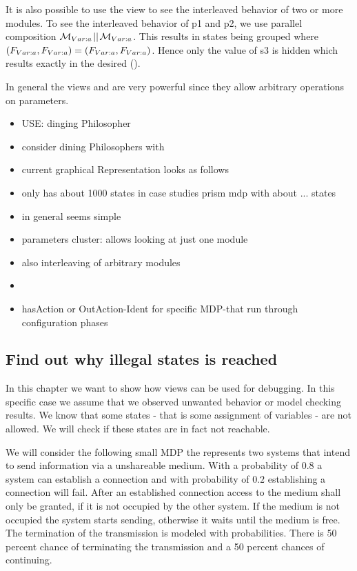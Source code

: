 \documentclass[preview]{standalone}
\begin{document}
It is also possible to use the view \viewparamvalident to see the interleaved behavior of two or more modules. To see the interleaved behavior of p1 and p2, we use parallel composition ${{{{{\mathcal{M}}}}_{{Var:{a}}}}} {\;\!{||}\;\!} {{{{{\mathcal{M}}}}_{{Var:{a}}}}}$. This results in states being grouped where $({{F_{{Var:{a}}}}}, {{F_{{Var:{a}}}}}) = ({{F_{{Var:{a}}}}}, {{F_{{Var:{a}}}}})$. Hence only the value of s3 is hidden which results exactly in the desired  ().

In general the views \viewparamdnf and \viewparamcnf are very powerful since they allow arbitrary operations on parameters.

\begin{itemize}
	\item USE: dinging Philosopher
	\item consider dining Philosophers with
	\item current graphical Representation looks as follows
	\item only has about 1000 states in case studies prism mdp with about ... states
	\item in general seems simple
	\item parameters cluster: allows looking at just one module
	\item also interleaving of arbitrary modules
	\item
	\item hasAction or OutAction-Ident for specific MDP-that run through configuration phases
	
\end{itemize}

\subsection{Find out why illegal states is reached}
In this chapter we want to show how views can be used for debugging. In this specific case we assume that we observed unwanted behavior or model checking results. We know that some states - that is some assignment of variables - are not allowed. We will check if these states are in fact not reachable.

We will consider the following small MDP the represents two systems that intend to send information via a unshareable medium. With a probability of $0.8$ a system can establish a connection and with probability of $0.2$ establishing a connection will fail. After an established connection access to the medium shall only be granted, if it is not occupied by the other system. If the medium is not occupied the system starts sending, otherwise it waits until the medium is free. The termination of the transmission is modeled with probabilities. There is 50 percent chance of terminating the transmission and a 50 percent chances of continuing.
\end{document}
